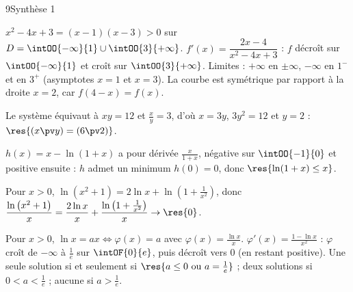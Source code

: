 \begin{corrige}{9}{Synthèse 1}
\begin{questions}
  \item $x^{2}-4x+3=(x-1)(x-3)>0$ sur $D=\intOO{-\infty}{1}\cup\intOO{3}{+\infty}$. $f'(x)=\dfrac{2x-4}{x^{2}-4x+3}$ : $f$ décroît sur
    $\intOO{-\infty}{1}$ et croît sur $\intOO{3}{+\infty}$. Limites : $+\infty$ en $\pm\infty$, $-\infty$ en $1^{-}$ et en $3^{+}$
    (asymptotes $x=1$ et $x=3$). La courbe est symétrique par rapport à la droite $x=2$, car $f(4-x)=f(x)$.
  \item Le système équivaut à $xy=12$ et $\frac xy=3$, d'où $x=3y$, $3y^{2}=12$ et $y=2$ : $\res{(x\pv y)=(6\pv2)}$.
  \item $h(x)=x-\ln(1+x)$ a pour dérivée $\frac{x}{1+x}$, négative sur $\intOO{-1}{0}$ et positive ensuite : $h$ admet un minimum
    $h(0)=0$, donc $\res{\ln(1+x)\leq x}$.
  \item Pour $x>0$, $\ln\left(x^{2}+1\right)=2\ln x+\ln\left(1+\frac{1}{x^{2}}\right)$, donc $\dfrac{\ln\left(x^{2}+1\right)}{x}=\dfrac{2\ln x}{x}+\dfrac{\ln\left(1+\frac{1}{x^{2}}\right)}{x}\to\res{0}$.
  \item Pour $x>0$, $\ln x=ax\iff\varphi(x)=a$ avec $\varphi(x)=\frac{\ln x}{x}$. $\varphi'(x)=\frac{1-\ln x}{x^{2}}$ : $\varphi$ croît de $-\infty$
    à $\frac1e$ sur $\intOF{0}{e}$, puis décroît vers $0$ (en restant positive). Une seule solution si et seulement si
    $\res{a\leq0\text{ ou }a=\frac1e}$ ; deux solutions si $0<a<\frac1e$ ; aucune si $a>\frac1e$.
\end{questions}
\end{corrige}

